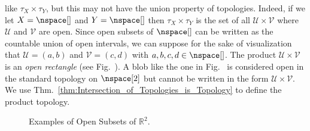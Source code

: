 \documentclass[oneside]{book}                                                  %
\begin{document}
                like $\tau_{X}\times\tau_{Y}$, but this may not have the union
                property of topologies. Indeed, if we let $X=\nspace[]$ and
                $Y=\nspace[]$ then $\tau_{X}\times\tau_{Y}$ is the set of all
                $\mathcal{U}\times\mathcal{V}$ where $\mathcal{U}$ and
                $\mathcal{V}$ are open. Since open subsets of $\nspace[]$ can be
                written as the countable union of open intervals, we can suppose
                for the sake of visualization that $\mathcal{U}=(a,b)$ and
                $\mathcal{V}=(c,d)$ with $a,b,c,d\in\nspace[]$. The product
                $\mathcal{U}\times\mathcal{V}$ is an \textit{open rectangle}
                (see Fig.~). A blob like the
                one in Fig.~ is considered
                open in the standard topology on $\nspace[2]$ but cannot be
                written in the form $\mathcal{U}\times\mathcal{V}$. We use
                Thm.~\ref{thm:Intersection_of_Topologies_is_Topology} to define
                the product topology.
                \begin{figure}[H]
                    \centering
                    \captionsetup{type=figure}
                    \begin{subfigure}[b]{0.49\textwidth}
                        \centering
                        
                        \label{fig:Open_Rectangle_in_R2}
                    \end{subfigure}
                    \begin{subfigure}[b]{0.49\textwidth}
                        \centering
                        \label{fig:Open_Subset_Not_Product}
                    \end{subfigure}
                    \caption{Examples of Open Subsets of $\mathbb{R}^{2}$.}
                    \label{fig:Point_Set_Top_Open_Subsets_R2}
                \end{figure}
\end{document}

